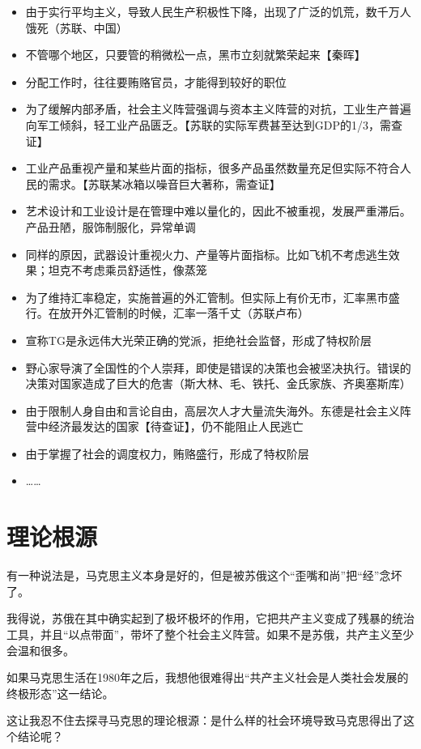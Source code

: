 \begin{itemize}
\item 由于实行平均主义，导致人民生产积极性下降，出现了广泛的饥荒，数千万人饿死（苏联、中国）
\item 不管哪个地区，只要管的稍微松一点，黑市立刻就繁荣起来【秦晖】
\item 分配工作时，往往要贿赂官员，才能得到较好的职位
\item 	为了缓解内部矛盾，社会主义阵营强调与资本主义阵营的对抗，工业生产普遍向军工倾斜，轻工业产品匮乏。【苏联的实际军费甚至达到GDP的1/3，需查证】
\item 	工业产品重视产量和某些片面的指标，很多产品虽然数量充足但实际不符合人民的需求。【苏联某冰箱以噪音巨大著称，需查证】
\item 艺术设计和工业设计是在管理中难以量化的，因此不被重视，发展严重滞后。产品丑陋，服饰制服化，异常单调
\item 同样的原因，武器设计重视火力、产量等片面指标。比如飞机不考虑逃生效果；坦克不考虑乘员舒适性，像蒸笼
\item 为了维持汇率稳定，实施普遍的外汇管制。但实际上有价无市，汇率黑市盛行。在放开外汇管制的时候，汇率一落千丈（苏联卢布）
\item 宣称TG是永远伟大光荣正确的党派，拒绝社会监督，形成了特权阶层
\item 	野心家导演了全国性的个人崇拜，即使是错误的决策也会被坚决执行。错误的决策对国家造成了巨大的危害（斯大林、毛、铁托、金氏家族、齐奥塞斯库）
\item 	由于限制人身自由和言论自由，高层次人才大量流失海外。东德是社会主义阵营中经济最发达的国家【待查证】，仍不能阻止人民逃亡
\item 由于掌握了社会的调度权力，贿赂盛行，形成了特权阶层
\item ……
\end{itemize}

\section{理论根源}

有一种说法是，马克思主义本身是好的，但是被苏俄这个“歪嘴和尚”把“经”念坏了。

我得说，苏俄在其中确实起到了极坏极坏的作用，它把共产主义变成了残暴的统治工具，并且“以点带面”，带坏了整个社会主义阵营。如果不是苏俄，共产主义至少会温和很多。

如果马克思生活在1980年之后，我想他很难得出“共产主义社会是人类社会发展的终极形态”这一结论。

这让我忍不住去探寻马克思的理论根源：是什么样的社会环境导致马克思得出了这个结论呢？

